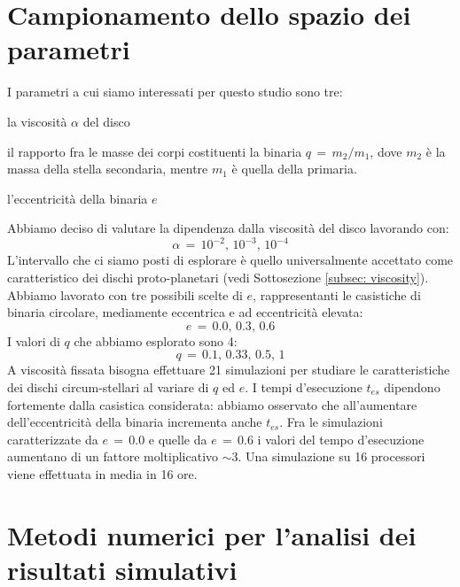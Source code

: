 \section{Campionamento dello spazio dei parametri}

I parametri a cui siamo interessati per questo studio sono tre:
\begin{list}{\textbf{-}}{\setlength{\itemsep}{0cm}}
    \item la viscosità $\alpha$ del disco
    \item il rapporto fra le masse dei corpi costituenti la binaria $q\,=\,m_2/m_1$, dove $m_2$ è la massa della stella secondaria, mentre $m_1$ è quella della primaria.
    \item l'eccentricità della binaria $e$
\end{list}

Abbiamo deciso di valutare la dipendenza dalla viscosità del disco lavorando con:
\begin{equation}
\alpha\,=\,10^{-2},\,10^{-3},\,10^{-4}
\label{eq:par_space_vis}
\end{equation}
L'intervallo che ci siamo posti di esplorare è quello universalmente accettato come caratteristico dei dischi proto-planetari (vedi Sottosezione \ref{subsec: viscosity}).
Abbiamo lavorato con tre possibili scelte di $e$, rappresentanti le casistiche di binaria circolare, mediamente eccentrica e ad eccentricità elevata:
\begin{equation}
e\,=\,0.0,\,0.3,\,0.6
\label{eq:par_space_ecc}
\end{equation}
I valori di $q$ che abbiamo esplorato sono 4:
\begin{equation}
q\,=\,0.1,\,0.33,\,0.5,\,1
\label{eq:par_space_q}
\end{equation}
A viscosità fissata bisogna effettuare 21 simulazioni per studiare le caratteristiche dei dischi circum-stellari al variare di $q$ ed $e$. I tempi d'esecuzione $t_{es}$ dipendono fortemente dalla casistica considerata: abbiamo osservato che all'aumentare dell'eccentricità della binaria incrementa anche $t_{es}$. Fra le simulazioni caratterizzate da $e\,=\,0.0$ e quelle da $e\,=\,0.6$ i valori del tempo d'esecuzione aumentano di un fattore moltiplicativo $\sim 3$. Una simulazione su 16 processori viene effettuata in media in 16 ore.

\section{Metodi numerici per l'analisi dei risultati simulativi} \label{sec:metnum_anal}

